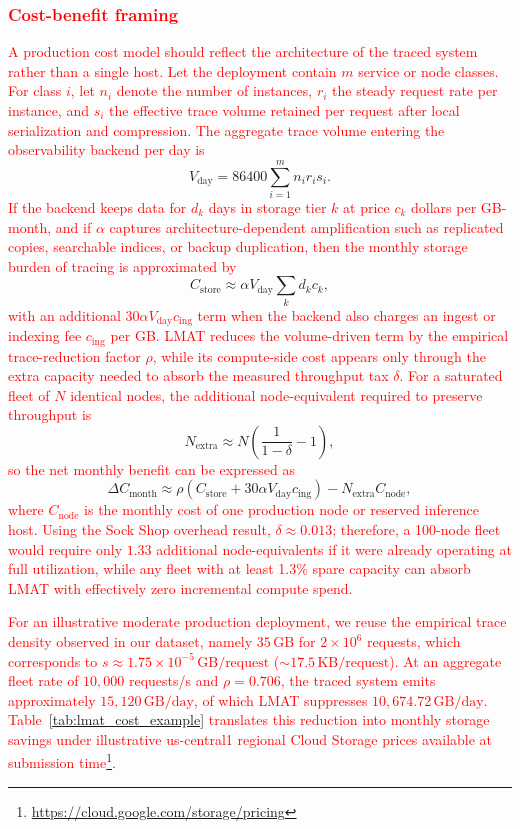 \documentclass[preprint,12pt]{elsarticle}
\begin{document}
\subsubsection{\textcolor{red}{Cost-benefit framing}}
\textcolor{red}{A production cost model should reflect the architecture of the traced system rather than a single host. Let the deployment contain \(m\) service or node classes. For class \(i\), let \(n_i\) denote the number of instances, \(r_i\) the steady request rate per instance, and \(s_i\) the effective trace volume retained per request after local serialization and compression. The aggregate trace volume entering the observability backend per day is}
{\color{red}
\[
V_{\text{day}} = 86400 \sum_{i=1}^{m} n_i r_i s_i .
\]
}
\textcolor{red}{If the backend keeps data for \(d_k\) days in storage tier \(k\) at price \(c_k\) dollars per GB-month, and if \(\alpha\) captures architecture-dependent amplification such as replicated copies, searchable indices, or backup duplication, then the monthly storage burden of tracing is approximated by}
{\color{red}
\[
C_{\text{store}} \approx \alpha V_{\text{day}} \sum_{k} d_k c_k ,
\]
}
\textcolor{red}{with an additional \(30 \alpha V_{\text{day}} c_{\text{ing}}\) term when the backend also charges an ingest or indexing fee \(c_{\text{ing}}\) per GB. LMAT reduces the volume-driven term by the empirical trace-reduction factor \(\rho\), while its compute-side cost appears only through the extra capacity needed to absorb the measured throughput tax \(\delta\). For a saturated fleet of \(N\) identical nodes, the additional node-equivalent required to preserve throughput is}
{\color{red}
\[
N_{\text{extra}} \approx N \left(\frac{1}{1-\delta}-1\right),
\]
}
\textcolor{red}{so the net monthly benefit can be expressed as}
{\color{red}
\[
\Delta C_{\text{month}} \approx \rho \left(C_{\text{store}} + 30 \alpha V_{\text{day}} c_{\text{ing}}\right) - N_{\text{extra}} C_{\text{node}},
\]
}
\textcolor{red}{where \(C_{\text{node}}\) is the monthly cost of one production node or reserved inference host. Using the Sock Shop overhead result, \(\delta \approx 0.013\); therefore, a 100-node fleet would require only \(1.33\) additional node-equivalents if it were already operating at full utilization, while any fleet with at least 1.3\% spare capacity can absorb LMAT with effectively zero incremental compute spend.}

\textcolor{red}{For an illustrative moderate production deployment, we reuse the empirical trace density observed in our dataset, namely \(35\,\text{GB}\) for \(2\times10^6\) requests, which corresponds to \(s \approx 1.75\times10^{-5}\,\text{GB/request}\) (\(\sim 17.5\,\text{KB/request}\)). At an aggregate fleet rate of \(10{,}000\) requests/s and \(\rho = 0.706\), the traced system emits approximately \(15{,}120\,\text{GB/day}\), of which LMAT suppresses \(10{,}674.72\,\text{GB/day}\). Table~\ref{tab:lmat_cost_example} translates this reduction into monthly storage savings under illustrative us-central1 regional Cloud Storage prices available at submission time\footnote{\url{https://cloud.google.com/storage/pricing}}.}
\end{document}
